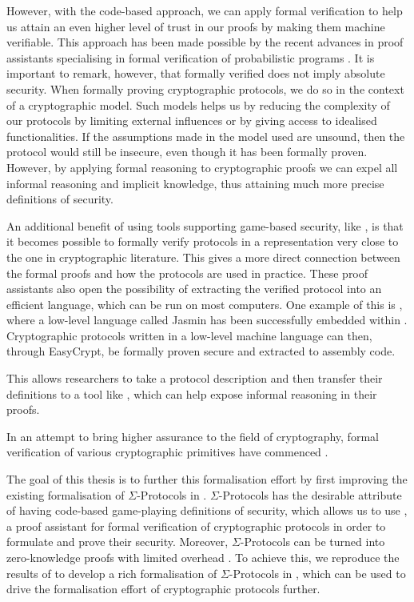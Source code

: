 However, with the code-based approach, we can apply
formal verification to help us attain an even higher level of trust in our
proofs by making them machine verifiable.
This approach has been made possible by the recent advances in proof assistants
specialising in formal verification of probabilistic programs \cite{SOK:CAC}.
It is important to remark, however, that formally verified does not imply
absolute security. When formally proving cryptographic protocols, we do so in
the context of a cryptographic model.
Such models helps us by reducing the complexity of our protocols
by limiting external influences or by giving access to idealised
functionalities. If the assumptions made in the model used are unsound, then the
protocol would still be insecure, even though it has been formally proven.
However, by applying formal
reasoning to cryptographic proofs we can expel all informal reasoning and
implicit knowledge, thus attaining much more precise definitions of security.

An additional benefit of using tools supporting game-based security, like \easycrypt, is that
it becomes possible to formally verify protocols in a representation very close
to the one in cryptographic literature. This gives a more direct connection between
the formal proofs and how the protocols are used in practice.
These proof assistants also open the possibility of extracting the verified
protocol into an efficient language, which can be run on most computers.
One example of this is \easycrypt, where a low-level language called Jasmin has
been successfully embedded within \cite{easycrypt-jasmin}.
Cryptographic protocols written in a low-level machine language can
then, through EasyCrypt, be formally proven secure and extracted to assembly code.


This allows researchers to take a protocol description and then transfer their
definitions to a tool like \easycrypt, which can help expose informal reasoning
in their proofs.


In an attempt to bring higher assurance to the field of cryptography, formal
verification of various cryptographic primitives have commenced
\cite{SOK:CAC,ec_intro,cryptoeprint:2019:1185,certicrypt_sigma}.

The goal of this thesis is to further this formalisation effort by first improving the
existing formalisation of $\Sigma$-Protocols in \easycrypt.
$\Sigma$-Protocols has the desirable attribute of having code-based
game-playing definitions of security, which allows us to use \easycrypt, a
proof assistant for formal verification of cryptographic protocols in order to formulate
and prove their security. Moreover, $\Sigma$-Protocols can be turned into
zero-knowledge proofs with limited overhead \cite{zkboo}.
To achieve this, we reproduce the results of \citet{cryptoeprint:2019:1185} to
develop a rich formalisation of $\Sigma$-Protocols in \easycrypt, which can be
used to drive the formalisation effort of cryptographic protocols further.

